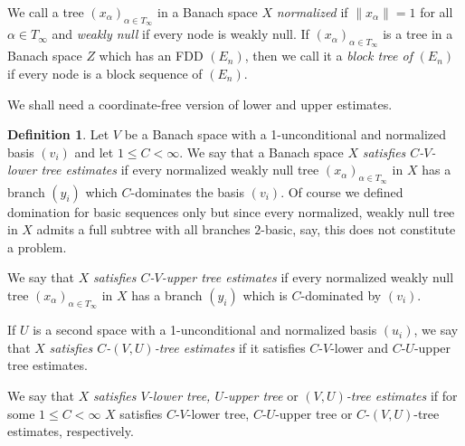 \documentclass[11pt,leqno]{amsart}
\theoremstyle{definition}
\newtheorem*{defin}{Definition}
\begin{document}
 We call a tree $(x_\alpha)_{\alpha\in T_\infty}$  in a  Banach space $X$
 {\em normalized} if $\|x_\alpha\|=1$ for all  $\alpha\in T_\infty$ and
{\em weakly null} if every node
 is weakly null.
    If  $(x_\alpha)_{\alpha\in T_\infty}$ is a tree in a Banach space
 $Z$
which
has an FDD $(E_n)$, then  we call it a
 {\em  block tree  of } $(E_n)$ if every node is a
 block sequence of $(E_n)$.


We shall need a coordinate-free version of lower and upper estimates.

\begin{defin}
  \label{D:1.2}
  Let $V$ be a Banach space with a 1-unconditional and normalized
 basis $(v_i)$ and let $1\le C<\infty$. We say that a Banach space $X$
 {\em satisfies $C$-$V$-lower tree estimates }if every normalized
 weakly null tree $(x_\alpha)_{\alpha\in T_\infty}$ in $X$ has a
 branch $(y_i)$ which $C$-dominates  the basis $(v_i)$. Of course we
 defined domination for basic sequences only but since every
 normalized, weakly null tree  in $X$ admits a full subtree with all
 branches $2$-basic, say, this does not constitute a problem.

 We say that $X$  {\em satisfies   $C$-$V$-upper tree estimates }if
 every normalized weakly null tree $(x_\alpha)_{\alpha\in T_\infty}$
 in $X$ has a branch $(y_i)$  which is  $C$-dominated  by $(v_i)$.
 
 If $U$ is a second space with a 1-unconditional and normalized basis
 $(u_i)$,
 we say that  $X$
 {\em satisfies $C$-$(V,U)$-tree estimates} if
 it satisfies $C$-$V$-lower and $C$-$U$-upper tree estimates.
 
 We say that $X$ {\em satisfies $V$-lower tree, $U$-upper tree} or
 {\em $(V,U)$-tree estimates} if for some $1\le C<\infty$ $X$ satisfies
 $C$-$V$-lower tree, $C$-$U$-upper tree or $C$-$(V,U)$-tree estimates,
 respectively.
\end{defin}
\end{document}
